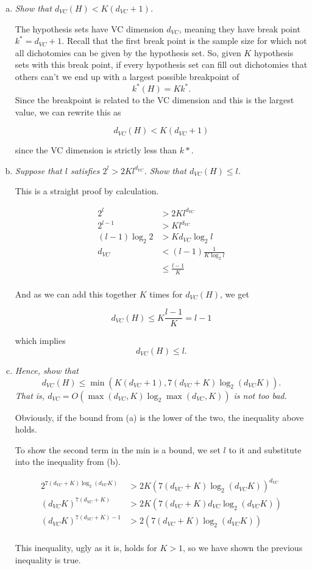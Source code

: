 \documentclass{article}
\begin{document}
\begin{enumerate}[(a)]
  \item \textit{Show that $d_{VC}(H) < K(d_{VC} + 1)$.}

    The hypothesis sets have VC dimension $d_{VC}$, meaning they have break point 
    $k^* = d_{VC}+1$. Recall that the first break point is the sample size for which not all
    dichotomies can be given by the hypothesis set. So, given $K$ hypothesis sets with this break
    point, if every hypothesis set can fill out dichotomies that others can't we end up with
    a largest possible breakpoint of $$k^*(H) = Kk^*.$$ Since the breakpoint is related to the VC
    dimension and this is the largest value, we can rewrite this as

    $$d_{VC}(H) < K(d_{VC}+1)$$

    since the VC dimension is strictly less than $k*$.


  \item \textit{Suppose that $l$ satisfies $2^l > 2Kl^{d_{VC}}$. Show that $d_{VC}(H) \leq l$.}

    This is a straight proof by calculation.

    \begin{align*}
      2^l &> 2Kl^{d_{VC}} \\
      2^{l-1} &> Kl^{d_{VC}} \\
      (l-1)\log_2 2 &> K d_{VC} \log_2 l \\
      d_{VC} &< (l-1) \frac{1}{K \log_2 l}\\
      &\leq \frac{l-1}{K} \\
    \end{align*}

    And as we can add this together $K$ times for $d_{VC}(H)$, we get

    $$d_{VC}(H) \leq K \frac{l-1}{K} = l-1$$

    which implies $$d_{VC}(H) \leq l.$$

  \item \textit{Hence, show that
    $$d_{VC}(H) \leq \min(K(d_{VC}+1), 7(d_{VC}+K)\log_2(d_{VC}K)).$$
    That is, $d_{VC} = O(\max(d_{VC},K)\log_2\max(d_{VC},K))$ is not too bad.}

    Obviously, if the bound from (a) is the lower of the two, the inequality above holds.

    To show the second term in the min is a bound, we set $l$ to it and substitute into the
    inequality from (b).

    \begin{align*}
      2^{7(d_{VC}+K)\log_2(d_{VC}K)} &> 2K(7(d_{VC}+K)\log_2(d_{VC}K))^{d_{VC}} \\
      (d_{VC}K)^{7(d_{VC}+K)} &> 2K(7(d_{VC}+K)d_{VC}\log_2(d_{VC}K)) \\
      (d_{VC}K)^{7(d_{VC}+K)-1} &> 2(7(d_{VC}+K)\log_2(d_{VC}K)) \\
    \end{align*}

    This inequality, ugly as it is, holds for $K > 1$, so we have shown the previous inequality
    is true.


\end{enumerate}
\end{document}
